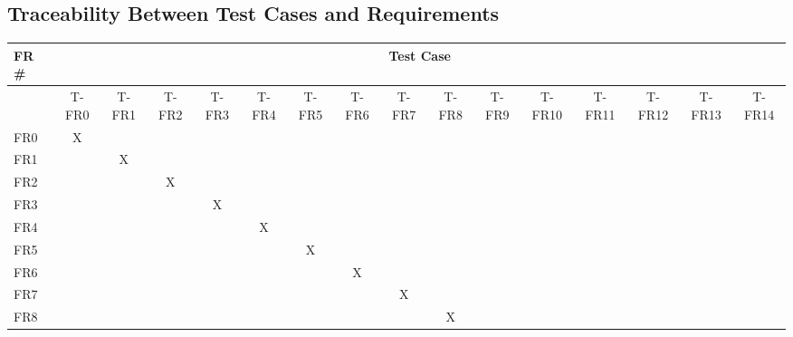 \documentclass[12pt, titlepage]{article}
\begin{document}
\subsection{Traceability Between Test Cases and Requirements}

\setlength\LTleft{-3cm}
\tiny
\begin{longtable}{lcccclllllclcccc}
\multicolumn{1}{l|}{FR \#} & \multicolumn{15}{c}{Test Case} \\ \hline
\endfirsthead
%
\endhead
%
\multicolumn{1}{l|}{} & T-FR0 & T-FR1 & T-FR2 & T-FR3 & \multicolumn{1}{c}{T-FR4} & \multicolumn{1}{c}{T-FR5} & \multicolumn{1}{c}{T-FR6} & \multicolumn{1}{c}{T-FR7} & \multicolumn{1}{c}{T-FR8} & T-FR9 & \multicolumn{1}{c}{T-FR10} & T-FR11 & T-FR12 & T-FR13 & T-FR14 \\
\multicolumn{1}{l|}{FR0} & X &  &  &  & \multicolumn{1}{c}{} & \multicolumn{1}{c}{} & \multicolumn{1}{c}{} & \multicolumn{1}{c}{} & \multicolumn{1}{c}{} &  &  &  &  &  &  \\
\multicolumn{1}{l|}{FR1} &  & X &  &  & \multicolumn{1}{c}{} & \multicolumn{1}{c}{} & \multicolumn{1}{c}{} & \multicolumn{1}{c}{} & \multicolumn{1}{c}{} &  &  &  &  &  &  \\
\multicolumn{1}{l|}{FR2} &  &  & X &  & \multicolumn{1}{c}{} & \multicolumn{1}{c}{} & \multicolumn{1}{c}{} & \multicolumn{1}{c}{} & \multicolumn{1}{c}{} &  &  &  &  &  &  \\
\multicolumn{1}{l|}{FR3} &  &  &  & X & \multicolumn{1}{c}{} & \multicolumn{1}{c}{} & \multicolumn{1}{c}{} & \multicolumn{1}{c}{} & \multicolumn{1}{c}{} &  &  &  &  &  &  \\
\multicolumn{1}{l|}{FR4} &  &  &  &  & \multicolumn{1}{c}{X} & \multicolumn{1}{c}{} & \multicolumn{1}{c}{} & \multicolumn{1}{c}{} & \multicolumn{1}{c}{} &  &  &  &  &  &  \\
\multicolumn{1}{l|}{FR5} &  &  &  &  & \multicolumn{1}{c}{} & \multicolumn{1}{c}{X} & \multicolumn{1}{c}{} & \multicolumn{1}{c}{} & \multicolumn{1}{c}{} &  &  &  &  &  &  \\
\multicolumn{1}{l|}{FR6} &  &  &  &  & \multicolumn{1}{c}{} & \multicolumn{1}{c}{} & \multicolumn{1}{c}{X} & \multicolumn{1}{c}{} & \multicolumn{1}{c}{} &  &  &  &  &  &  \\
\multicolumn{1}{l|}{FR7} &  &  &  &  & \multicolumn{1}{c}{} & \multicolumn{1}{c}{} & \multicolumn{1}{c}{} & \multicolumn{1}{c}{X} & \multicolumn{1}{c}{} &  &  &  &  &  &  \\
\multicolumn{1}{l|}{FR8} &  &  &  &  & \multicolumn{1}{c}{} & \multicolumn{1}{c}{} & \multicolumn{1}{c}{} & \multicolumn{1}{c}{} & \multicolumn{1}{c}{X} &  &  &  &  &  &  \\

\end{longtable}
\end{document}
